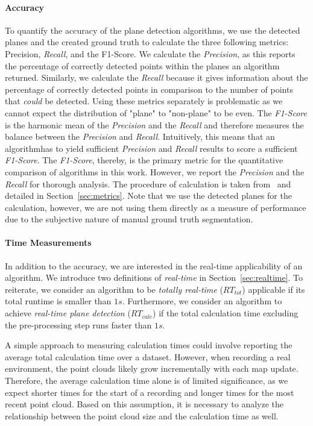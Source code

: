 \documentclass[main.tex]{subfiles}
\begin{document}
\paragraph{Accuracy}
To quantify the accuracy of the plane detection algorithms, we use the detected planes and the created ground truth to calculate the three following
metrics: Precision, \textit{Recall}, and the F1-Score.
We calculate the \textit{Precision}, as this reports the percentage of correctly detected points within the planes an algorithm returned.
Similarly, we calculate the \textit{Recall} because it gives information about the percentage of correctly detected points in comparison to the number of 
points that \textit{could} be detected.
Using these metrics separately is problematic as we cannot expect the distribution of "plane" to "non-plane" to be even. 
The \textit{F1-Score} is the harmonic mean of the \textit{Precision} and the \textit{Recall} and therefore measures the balance between the \textit{Precision} and
\textit{Recall}. Intuitively, this means that an algorithmhas to yield sufficient \textit{Precision} and \textit{Recall} results to score 
a sufficient \textit{F1-Score}. The \textit{F1-Score}, thereby, is the primary metric for the quantitative comparison of algorithms in this work. 
However, we report the \textit{Precision} and the \textit{Recall} for thorough analysis.
The procedure of calculation is taken from~\cite[Section~4]{Araújo_Oliveira_2020} and detailed in Section~\ref{sec:metrics}.
Note that we use the detected planes for the calculation, however, we are not using them directly as a measure of performance due to the subjective
nature of manual ground truth segmentation.

\paragraph{Time Measurements}
\label{par:time}
In addition to the accuracy, we are interested in the real-time applicability of an algorithm.
We introduce two definitions of \textit{real-time} in Section~\ref{sec:realtime}.
To reiterate, we consider an algorithm to be \textit{totally real-time} ($RT_{tot}$) applicable if its total runtime is smaller than $1s$.
Furthermore, we consider an algorithm to achieve \textit{real-time plane detection} ($RT_{calc}$) if the total calculation time
excluding the pre-processing step runs faster than $1s.$


A simple approach to measuring calculation times could involve reporting the average total calculation time over a dataset. 
However, when recording a real environment, the point clouds likely grow incrementally with each map update.
Therefore, the average calculation time alone is of limited significance, as we expect shorter times for the start of a recording
and longer times for the most recent point cloud. Based on this assumption, it is necessary to analyze the
relationship between the point cloud size and the calculation time as well.
\end{document}

